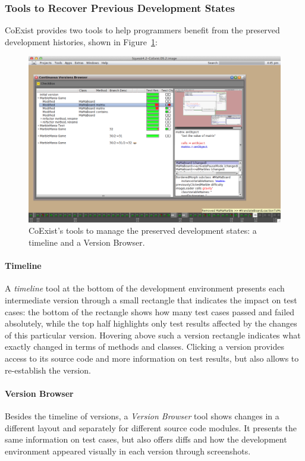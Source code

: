 \subsubsection{Tools to Recover Previous Development States}

CoExist provides two tools to help programmers benefit from the preserved development histories, shown in Figure~\ref{fig:CoExist}:

\begin{figure}[h]
    \centering
    \includegraphics[width=\textwidth]{figures/2_background/4_coexistTools.pdf}
    \caption{CoExist's tools to manage the preserved development states: a timeline and a Version Browser.}
    \label{fig:CoExist}
\end{figure}

\paragraph{Timeline}
A \emph{timeline} tool at the bottom of the development environment presents each intermediate version through a small rectangle that indicates the impact on test cases: the bottom of the rectangle shows how many test cases passed and failed absolutely, while the top half highlights only test results affected by the changes of this particular version.
Hovering above such a version rectangle indicates what exactly changed in terms of methods and classes.
Clicking a version provides access to its source code and more information on test results, but also allows to re-establish the version.

\paragraph{Version Browser}
Besides the timeline of versions, a \emph{Version Browser} tool shows changes in a different layout and separately for different source code modules.
It presents the same information on test cases, but also offers diffs and how the development environment appeared visually in each version through screenshots.

